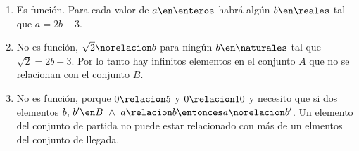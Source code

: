 \begin{enumerate}[label=\roman*)]
  \item Es función. Para cada valor de $a \en \enteros$ habrá algún $b \en \reales$ tal que $a = 2b -3$.

  \item No es función, $\sqrt{2} \norelacion b$ para ningún $b \en \naturales$ tal que $\sqrt{2} = 2b - 3$. Por lo tanto hay infinitos
        elementos en el conjunto $A$ que no se relacionan con el conjunto $B$.

  \item No es función, porque $0 \relacion 5$ y $0 \relacion 10$ y necesito que si dos elementos $b,\, b' \en B ~\land~ a \relacion b \entonces a \norelacion b'$.
        Un elemento del conjunto de partida no puede estar relacionado con más de un elmentos del conjunto de llegada.
\end{enumerate}
